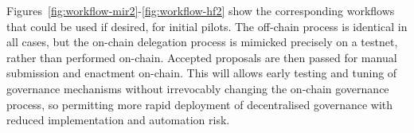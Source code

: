 Figures~\ref{fig:workflow-mir2}-\ref{fig:workflow-hf2} show the corresponding  workflows that could be used if desired,
for initial pilots.  The off-chain process is identical in all cases, but the on-chain delegation process is mimicked precisely on a testnet, rather than performed
on-chain.  Accepted proposals are then passed for manual submission and enactment on-chain.  This will allows early testing and tuning of governance mechanisms without
irrevocably changing the on-chain governance process, so permitting more rapid deployment of decentralised governance with reduced implementation and automation risk.

\clearpage
